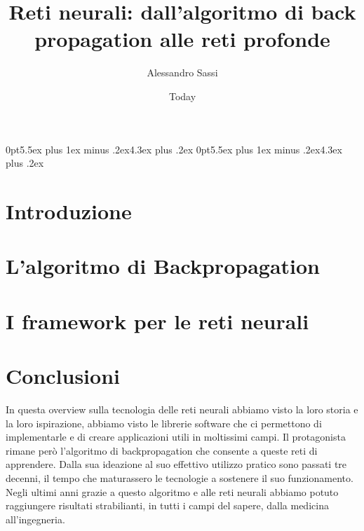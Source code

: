 \documentclass [12pt ,a4paper,openany]{book}
\begin{document}
\title{Reti neurali: dall'algoritmo di back propagation alle reti profonde }
\author{Alessandro Sassi}
\date{Today}

\titlespacing*{\section}
{0pt}{5.5ex plus 1ex minus .2ex}{4.3ex plus .2ex}
\titlespacing*{\subsection}
{0pt}{5.5ex plus 1ex minus .2ex}{4.3ex plus .2ex}






\tableofcontents
\chapter{Introduzione}

\chapter{L'algoritmo di Backpropagation }

\chapter{I framework per le reti neurali}


\chapter{Conclusioni}
In questa overview sulla tecnologia delle reti neurali abbiamo visto la loro storia e la loro ispirazione, abbiamo visto le librerie software che ci permettono di implementarle e di creare applicazioni utili in moltissimi campi. Il protagonista rimane però l'algoritmo di backpropagation che consente a queste reti di apprendere. Dalla sua ideazione al suo effettivo utilizzo pratico sono passati tre decenni, il tempo che maturassero le tecnologie a sostenere il suo funzionamento. Negli ultimi anni grazie a questo algoritmo e alle reti neurali abbiamo potuto raggiungere risultati strabilianti, in tutti i campi del sapere, dalla medicina all'ingegneria.
\end{document}
